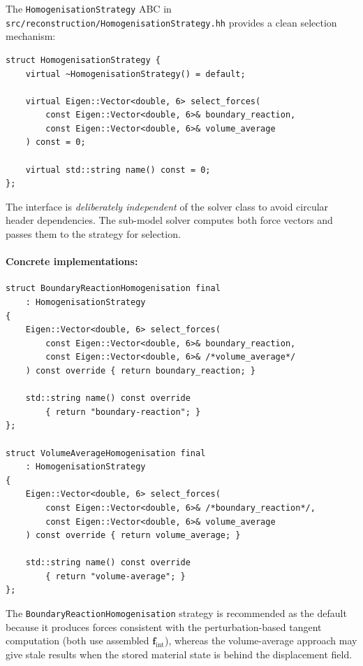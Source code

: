 The \texttt{HomogenisationStrategy} ABC in
\texttt{src/reconstruction/HomogenisationStrategy.hh} provides a
clean selection mechanism:

\begin{lstlisting}[caption={Homogenisation strategy interface.},
                   label={lst:homogenisation-strategy}]
struct HomogenisationStrategy {
    virtual ~HomogenisationStrategy() = default;

    virtual Eigen::Vector<double, 6> select_forces(
        const Eigen::Vector<double, 6>& boundary_reaction,
        const Eigen::Vector<double, 6>& volume_average
    ) const = 0;

    virtual std::string name() const = 0;
};
\end{lstlisting}

The interface is \emph{deliberately independent} of the solver class
to avoid circular header dependencies.  The sub-model solver
computes both force vectors and passes them to the strategy for
selection.

\paragraph{Concrete implementations:}

\begin{lstlisting}[caption={Concrete homogenisation strategies.},
                   label={lst:homogenisation-impls}]
struct BoundaryReactionHomogenisation final
    : HomogenisationStrategy
{
    Eigen::Vector<double, 6> select_forces(
        const Eigen::Vector<double, 6>& boundary_reaction,
        const Eigen::Vector<double, 6>& /*volume_average*/
    ) const override { return boundary_reaction; }

    std::string name() const override
        { return "boundary-reaction"; }
};

struct VolumeAverageHomogenisation final
    : HomogenisationStrategy
{
    Eigen::Vector<double, 6> select_forces(
        const Eigen::Vector<double, 6>& /*boundary_reaction*/,
        const Eigen::Vector<double, 6>& volume_average
    ) const override { return volume_average; }

    std::string name() const override
        { return "volume-average"; }
};
\end{lstlisting}

The \texttt{BoundaryReactionHomogenisation} strategy is recommended
as the default because it produces forces consistent with the
perturbation-based tangent computation (both use assembled
$\mathbf{f}_{\mathrm{int}}$), whereas the volume-average approach
may give stale results when the stored material state is behind the
displacement field.


